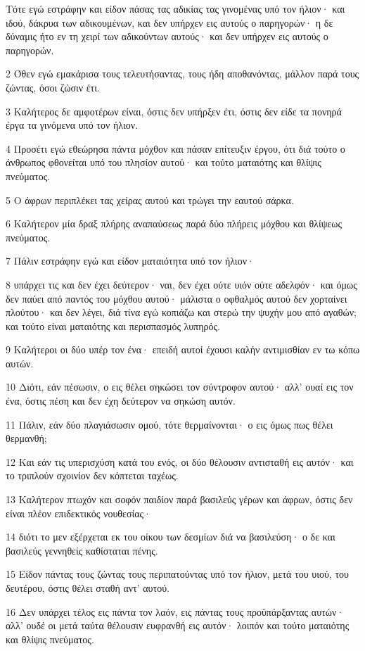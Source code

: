\par Τότε εγώ εστράφην και είδον πάσας τας αδικίας τας γινομένας υπό τον ήλιον· και ιδού, δάκρυα των αδικουμένων, και δεν υπήρχεν εις αυτούς ο παρηγορών· η δε δύναμις ήτο εν τη χειρί των αδικούντων αυτούς· και δεν υπήρχεν εις αυτούς ο παρηγορών.
\par 2 Όθεν εγώ εμακάρισα τους τελευτήσαντας, τους ήδη αποθανόντας, μάλλον παρά τους ζώντας, όσοι ζώσιν έτι.
\par 3 Καλήτερος δε αμφοτέρων είναι, όστις δεν υπήρξεν έτι, όστις δεν είδε τα πονηρά έργα τα γινόμενα υπό τον ήλιον.
\par 4 Προσέτι εγώ εθεώρησα πάντα μόχθον και πάσαν επίτευξιν έργου, ότι διά τούτο ο άνθρωπος φθονείται υπό του πλησίον αυτού· και τούτο ματαιότης και θλίψις πνεύματος.
\par 5 Ο άφρων περιπλέκει τας χείρας αυτού και τρώγει την εαυτού σάρκα.
\par 6 Καλήτερον μία δραξ πλήρης αναπαύσεως παρά δύο πλήρεις μόχθου και θλίψεως πνεύματος.
\par 7 Πάλιν εστράφην εγώ και είδον ματαιότητα υπό τον ήλιον·
\par 8 υπάρχει τις και δεν έχει δεύτερον· ναι, δεν έχει ούτε υιόν ούτε αδελφόν· και όμως δεν παύει από παντός του μόχθου αυτού· μάλιστα ο οφθαλμός αυτού δεν χορταίνει πλούτου· και δεν λέγει, διά τίνα εγώ κοπιάζω και στερώ την ψυχήν μου από αγαθών; και τούτο είναι ματαιότης και περισπασμός λυπηρός.
\par 9 Καλήτεροι οι δύο υπέρ τον ένα· επειδή αυτοί έχουσι καλήν αντιμισθίαν εν τω κόπω αυτών.
\par 10 Διότι, εάν πέσωσιν, ο εις θέλει σηκώσει τον σύντροφον αυτού· αλλ' ουαί εις τον ένα, όστις πέση και δεν έχη δεύτερον να σηκώση αυτόν.
\par 11 Πάλιν, εάν δύο πλαγιάσωσιν ομού, τότε θερμαίνονται· ο εις όμως πως θέλει θερμανθή;
\par 12 Και εάν τις υπερισχύση κατά του ενός, οι δύο θέλουσιν αντισταθή εις αυτόν· και το τριπλούν σχοινίον δεν κόπτεται ταχέως.
\par 13 Καλήτερον πτωχόν και σοφόν παιδίον παρά βασιλεύς γέρων και άφρων, όστις δεν είναι πλέον επιδεκτικός νουθεσίας·
\par 14 διότι το μεν εξέρχεται εκ του οίκου των δεσμίων διά να βασιλεύση· ο δε και βασιλεύς γεννηθείς καθίσταται πένης.
\par 15 Είδον πάντας τους ζώντας τους περιπατούντας υπό τον ήλιον, μετά του υιού, του δευτέρου, όστις θέλει σταθή αντ' αυτού.
\par 16 Δεν υπάρχει τέλος εις πάντα τον λαόν, εις πάντας τους προϋπάρξαντας αυτών· αλλ' ουδέ οι μετά ταύτα θέλουσιν ευφρανθή εις αυτόν· λοιπόν και τούτο ματαιότης και θλίψις πνεύματος.

